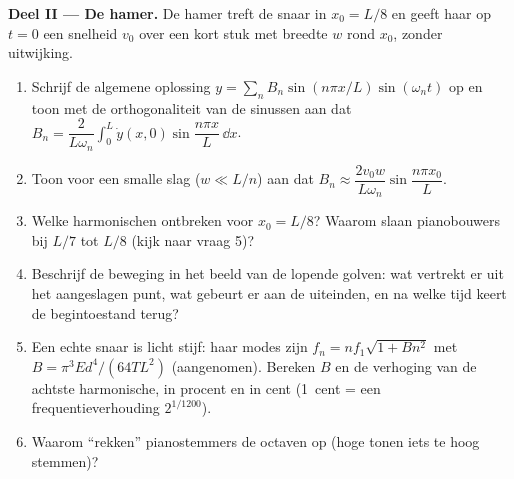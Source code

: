 \begin{problem}
\medskip
\noindent\textbf{Deel II --- De hamer.}
De hamer treft de snaar in $x_0 = L/8$ en geeft haar op $t = 0$ een snelheid
$v_0$ over een kort stuk met breedte $w$ rond $x_0$, zonder uitwijking.
\begin{enumerate}[resume]
  \item Schrijf de algemene oplossing
        $y = \sum_nB_n\sin(n\pi x/L)\sin(\omega_nt)$ op en toon met de
        orthogonaliteit van de sinussen aan dat
        $B_n =
        \dfrac{2}{L\omega_n}\int_0^L\dot y(x, 0)\sin\dfrac{n\pi x}L\,\dd x$.
  \item Toon voor een smalle slag ($w \ll L/n$) aan dat
        $B_n \approx \dfrac{2v_0w}
        {L\omega_n}\sin\dfrac{n\pi x_0}{L}$.
  \item Welke harmonischen ontbreken voor $x_0 = L/8$? Waarom slaan
        pianobouwers bij $L/7$ tot $L/8$ (kijk naar vraag 5)?
  \item Beschrijf de beweging in het beeld van de lopende golven: wat
        vertrekt er uit het aangeslagen punt, wat gebeurt er aan de
        uiteinden, en na welke tijd keert de begintoestand terug?
  \item Een echte snaar is licht stijf: haar modes zijn
        $f_n = nf_1
        \sqrt{1 + Bn^2}$ met $B = \pi^3Ed^4/(64TL^2)$
        (aangenomen). Bereken $B$ en de verhoging van de achtste
        harmonische, in procent en in cent (\qty{1}{cent} = een
        frequentieverhouding $2^{1/1200}$).
  \item Waarom ``rekken'' pianostemmers de octaven op (hoge tonen iets te
        hoog stemmen)?
\end{enumerate}


\end{problem}
